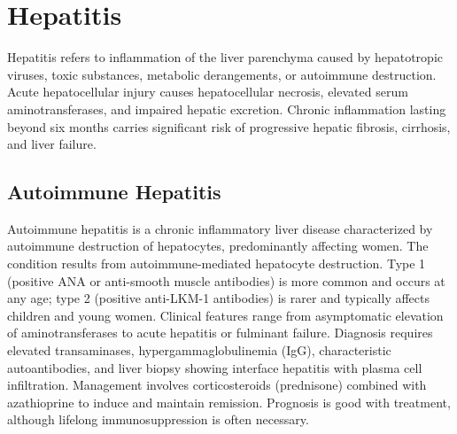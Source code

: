 \section{Hepatitis}




Hepatitis refers to inflammation of the liver parenchyma caused by hepatotropic viruses, toxic substances, metabolic derangements, or autoimmune destruction. Acute hepatocellular injury causes hepatocellular necrosis, elevated serum aminotransferases, and impaired hepatic excretion. Chronic inflammation lasting beyond six months carries significant risk of progressive hepatic fibrosis, cirrhosis, and liver failure.





\label{sec:Hepatitis}

\subsection{Autoimmune Hepatitis}
\label{sec:Autoimmune Hepatitis}
Autoimmune hepatitis is a chronic inflammatory liver disease characterized by autoimmune destruction of hepatocytes, predominantly affecting women. The condition results from autoimmune-mediated hepatocyte destruction. Type 1 (positive ANA or anti-smooth muscle antibodies) is more common and occurs at any age; type 2 (positive anti-LKM-1 antibodies) is rarer and typically affects children and young women. Clinical features range from asymptomatic elevation of aminotransferases to acute hepatitis or fulminant failure. Diagnosis requires elevated transaminases, hypergammaglobulinemia (IgG), characteristic autoantibodies, and liver biopsy showing interface hepatitis with plasma cell infiltration. Management involves corticosteroids (prednisone) combined with azathioprine to induce and maintain remission. Prognosis is good with treatment, although lifelong immunosuppression is often necessary.


